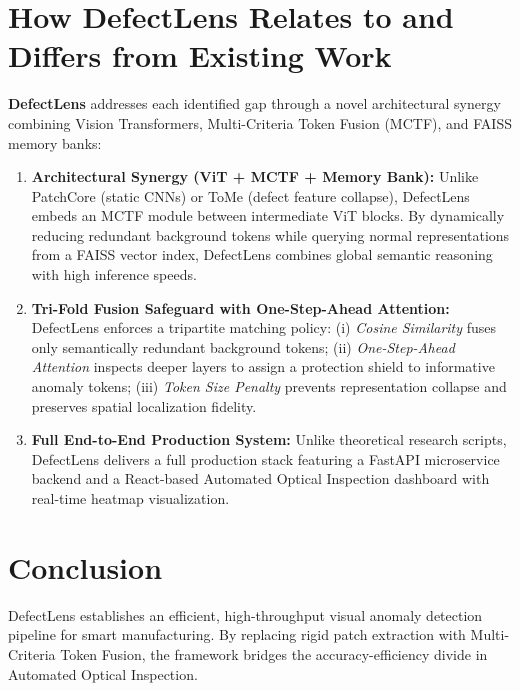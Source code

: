 \documentclass[10pt,journal,compsoc]{IEEEtran}
\begin{document}
\section{How DefectLens Relates to and Differs from Existing Work}
\textbf{DefectLens} addresses each identified gap through a novel architectural synergy combining Vision Transformers, Multi-Criteria Token Fusion (MCTF), and FAISS memory banks:
\begin{enumerate}[label=\textbf{\arabic*.}]
    \item \textbf{Architectural Synergy (ViT + MCTF + Memory Bank):} Unlike PatchCore (static CNNs) or ToMe (defect feature collapse), DefectLens embeds an MCTF module between intermediate ViT blocks. By dynamically reducing redundant background tokens while querying normal representations from a FAISS vector index, DefectLens combines global semantic reasoning with high inference speeds.
    \item \textbf{Tri-Fold Fusion Safeguard with One-Step-Ahead Attention:} DefectLens enforces a tripartite matching policy: (i) \textit{Cosine Similarity} fuses only semantically redundant background tokens; (ii) \textit{One-Step-Ahead Attention} inspects deeper layers to assign a protection shield to informative anomaly tokens; (iii) \textit{Token Size Penalty} prevents representation collapse and preserves spatial localization fidelity.
    \item \textbf{Full End-to-End Production System:} Unlike theoretical research scripts, DefectLens delivers a full production stack featuring a FastAPI microservice backend and a React-based Automated Optical Inspection dashboard with real-time heatmap visualization.
\end{enumerate}

\section{Conclusion}
DefectLens establishes an efficient, high-throughput visual anomaly detection pipeline for smart manufacturing. By replacing rigid patch extraction with Multi-Criteria Token Fusion, the framework bridges the accuracy-efficiency divide in Automated Optical Inspection.
\end{document}
